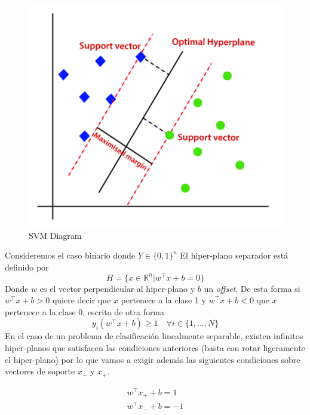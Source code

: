 \begin{figure}[H]
    \center
    \includegraphics[scale=0.3]{notebooks/ML/img/svm_diagram.png}
    \caption{SVM Diagram}
\end{figure}

Consideremos el caso binario donde $Y \in \{0,1\}^n$ El hiper-plano separador está definido por 
$$ H = \{ x \in \mathbb{R}^n | w^{\top}x + b = 0 \} $$ 
Donde $w$ es el vector perpendicular al hiper-plano y $b$ un \textit{offset}. 
De esta forma si $w^{\top}x + b > 0$ quiere decir que $x$ pertenece a la clase 1 y $w^{\top}x + b < 0$ que $x$ pertenece a la clase 0, escrito de otra forma 
$$y_i(w^{\top}x+b) \geq 1 \quad \forall i \in \{ 1 , \dots , N \}$$
En el caso de un problema de clasificación linealmente separable, existen infinitos hiper-planos que satisfacen las condiciones anteriores (basta con rotar ligeramente el hiper-plano) por lo que vamos a exigir además las siguientes condiciones sobre vectores de soporte $x_{-}$ y $x_{+}$. 

\begin{equation*}
\begin{split}
w^{\top}x_{+} + b = 1 \\
w^{\top}x_{-} + b = -1
\end{split}
\end{equation*} 

